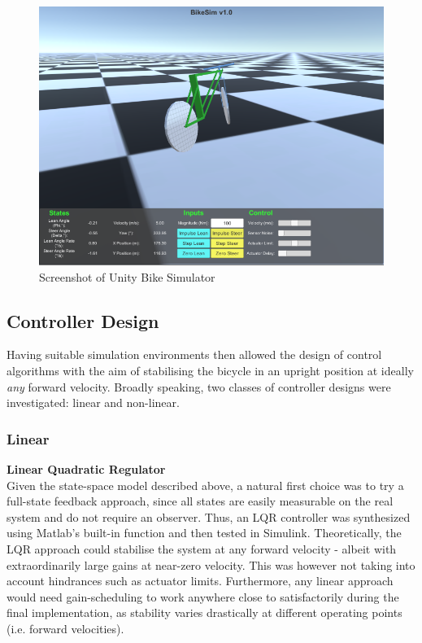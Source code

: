 \documentclass[12pt]{article}
\begin{document}
\begin{figure}[H]
\centering
\includegraphics[scale=0.5]{BikeSim}
\caption{Screenshot of Unity Bike Simulator}
\end{figure}

\subsection{Controller Design}
Having suitable simulation environments then allowed the design of control algorithms with the aim of stabilising the bicycle in an upright position at ideally \textit{any} forward velocity. Broadly speaking, two classes of controller designs were investigated: linear and non-linear.

\subsubsection{Linear}
\textbf{Linear Quadratic Regulator} \\
Given the state-space model described above, a natural first choice was to try a full-state feedback approach, since all states are easily measurable on the real system and do not require an observer. Thus, an LQR controller was synthesized using Matlab's built-in function and then tested in Simulink. Theoretically, the LQR approach could stabilise the system at any forward velocity - albeit with extraordinarily large gains at near-zero velocity. This was however not taking into account hindrances such as actuator limits. Furthermore, any linear approach would need gain-scheduling to work anywhere close to satisfactorily during the final implementation, as stability varies drastically at different operating points (i.e. forward velocities). \\
\end{document}
